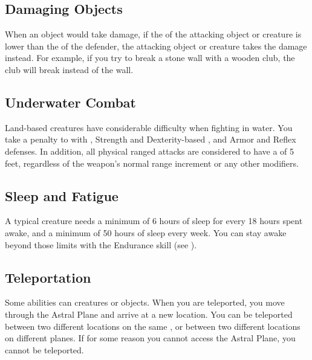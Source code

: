     \subsection{Damaging Objects}\label{Damaging Objects}
        When an object would take damage, if the  of the attacking object or creature is lower than the  of the defender, the attacking object or creature takes the damage instead.
        For example, if you try to break a stone wall with a wooden club, the club will break instead of the wall.

    \subsection{Underwater Combat}\label{Underwater Combat}
        Land-based creatures have considerable difficulty when fighting in water.
        You take a  penalty to  with , Strength and Dexterity-based , and Armor and Reflex defenses.
        In addition, all physical ranged attacks are considered to have a  of 5 feet, regardless of the weapon's normal range increment or any other modifiers.

    \subsection{Sleep and Fatigue}\label{Sleep and Fatigue}
        A typical creature needs a minimum of 6 hours of sleep for every 18 hours spent awake, and a minimum of 50 hours of sleep every week.
        You can stay awake beyond those limits with the Endurance skill (see ).

    \subsection{Teleportation}\label{Teleportation}
        Some abilities can  creatures or objects.
        When you are teleported, you move through the Astral Plane and arrive at a new location.
        You can be teleported between two different locations on the same , or between two different locations on different planes.
        If for some reason you cannot access the Astral Plane, you cannot be teleported.

